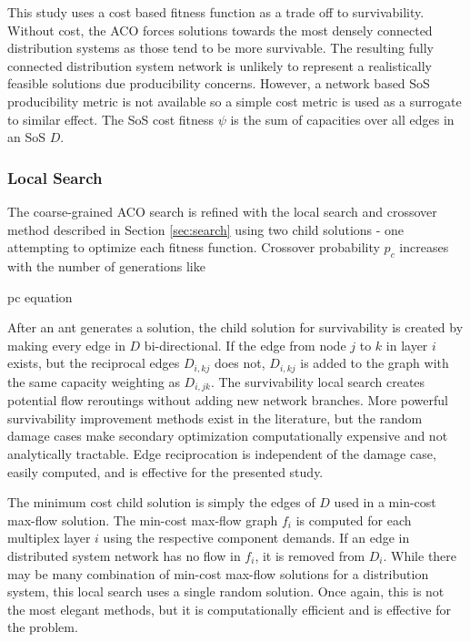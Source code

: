 \documentclass[preprint,12pt]{elsarticle}
\begin{document}
This study uses a cost based fitness function as a trade off to survivability. Without cost, the ACO forces solutions towards the most densely connected distribution systems as those tend to be more survivable. The resulting fully connected distribution system network is unlikely to represent a realistically feasible solutions due producibility concerns. However, a network based SoS producibility metric is not available so a simple cost metric is used as a surrogate to similar effect. The SoS cost fitness $\psi$ is the sum of capacities over all edges in an SoS $D$.



\subsubsection{Local Search}

The coarse-grained ACO search is refined with the local search and crossover method described in Section \ref{sec:search} using two child solutions - one attempting to optimize each fitness function. Crossover probability $p_c$ increases with the number of generations like

pc equation

After an ant generates a solution, the child solution for survivability is created by making every edge in $D$ bi-directional. If the edge from node $j$ to $k$ in layer $i$ exists, but the reciprocal edges $D_{i,kj}$ does not, $D_{i,kj}$ is added to the graph with the same capacity weighting as $D_{i,jk}$. The survivability local search creates potential flow reroutings without adding new network branches. More powerful survivability improvement methods exist in the literature, but the random damage cases make secondary optimization computationally expensive and not analytically tractable. Edge reciprocation is independent of the damage case, easily computed, and is effective for the presented study. 

The minimum cost child solution is simply the edges of $D$ used in a min-cost max-flow solution. The min-cost max-flow graph $f_i$ is computed for each multiplex layer $i$ using the respective component demands. If an edge in distributed system network has no flow in $f_i$, it is removed from $D_i$. While there may be many combination of min-cost max-flow solutions for a distribution system, this local search uses a single random solution. Once again, this is not the most elegant methods, but it is computationally efficient and is effective for the problem.
\end{document}
